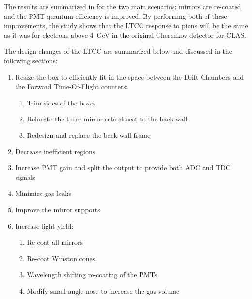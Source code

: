 The results are summarized in  for the two main scenarios: mirrors are re-coated and the
PMT quantum efficiency is improved. By performing both of these improvements, the study shows that the LTCC
response to pions will be the same as it was for electrons above 4~GeV in the original Cherenkov detector for CLAS.

The design changes of the LTCC are summarized below and discussed in the following sections:

\begin{enumerate}
\item Resize the box to efficiently fit in the space between the Drift Chambers and the Forward Time-Of-Flight
  counters:
	\begin{enumerate}
		\item Trim sides of the boxes
		\item Relocate the three mirror sets closest to the back-wall
		\item Redesign and replace the back-wall frame
	\end{enumerate}

	\item Decrease inefficient regions
	\item Increase PMT gain and split the output to provide both ADC and TDC signals
	\item Minimize gas leaks
	\item Improve the mirror supports
	\item Increase light yield:
	\begin{enumerate}
		\item Re-coat all mirrors
		\item Re-coat Winston cones
		\item Wavelength shifting re-coating of the PMTs
		\item Modify small angle nose to increase the gas volume
	\end{enumerate}
\end{enumerate}








